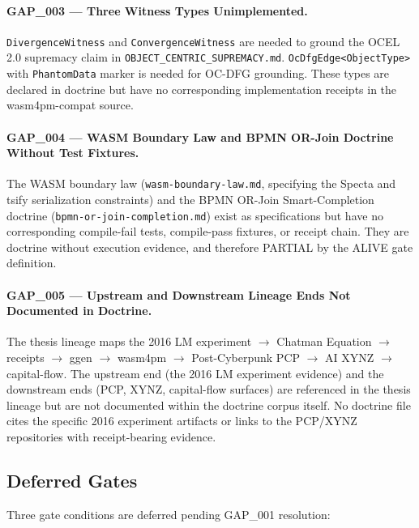 \paragraph{GAP\_003 --- Three Witness Types Unimplemented.}
\texttt{DivergenceWitness} and \texttt{ConvergenceWitness} are needed to ground the OCEL 2.0
supremacy claim in \texttt{OBJECT\_CENTRIC\_SUPREMACY.md}. \texttt{OcDfgEdge\textless{}ObjectType\textgreater{}}
with \texttt{PhantomData} marker is needed for OC-DFG grounding. These types are declared in
doctrine but have no corresponding implementation receipts in the wasm4pm-compat source.

\paragraph{GAP\_004 --- WASM Boundary Law and BPMN OR-Join Doctrine Without Test Fixtures.}
The WASM boundary law (\texttt{wasm-boundary-law.md}, specifying the Specta and tsify
serialization constraints) and the BPMN OR-Join Smart-Completion doctrine
(\texttt{bpmn-or-join-completion.md}) exist as specifications but have no corresponding
compile-fail tests, compile-pass fixtures, or receipt chain. They are doctrine without
execution evidence, and therefore PARTIAL by the ALIVE gate definition.

\paragraph{GAP\_005 --- Upstream and Downstream Lineage Ends Not Documented in Doctrine.}
The thesis lineage maps the 2016 LM experiment $\to$ Chatman Equation $\to$ receipts $\to$
ggen $\to$ wasm4pm $\to$ Post-Cyberpunk PCP $\to$ AI XYNZ $\to$ capital-flow. The upstream
end (the 2016 LM experiment evidence) and the downstream ends (PCP, XYNZ, capital-flow
surfaces) are referenced in the thesis lineage but are not documented within the doctrine
corpus itself. No doctrine file cites the specific 2016 experiment artifacts or links to the
PCP/XYNZ repositories with receipt-bearing evidence.

\subsection{Deferred Gates}
\label{sec:doctrine-open-deferred}

Three gate conditions are deferred pending GAP\_001 resolution:

